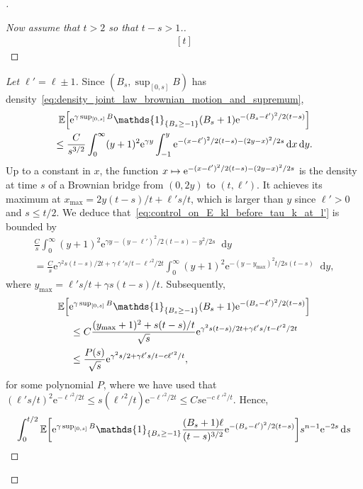 \documentclass[10pt]{amsart}
\theoremstyle{definition}\newtheorem{defi}[theo]{Definition}\newtheorem{rema}[theo]{Remark}\newtheorem{exam}[theo]{Example}\newtheorem{exem}[theo]{Example}\newtheorem{nota}[theo]{Notation}
\newcommand{\e}{\mathrm{e}}
\renewcommand{\d}[1]{\mathop{}\!\mathrm{d}#1}
\newcommand{\E}{\mathbb{E}}
\newcommand\1{\mathds{1}}
\let\originalleft\left
\let\originalright\right
\renewcommand{\left}{\mathopen{}\mathclose\bgroup\originalleft}
\renewcommand{\right}{\aftergroup\egroup\originalright}
\let\oldmapsto\mapsto
\renewcommand*{\mapsto}{\mathchoice{\longmapsto}{\oldmapsto}{\oldmapsto}{\oldmapsto}}
\newenvironment{proofc}[1][\proofname]{\begin{proof}[#1]}{\end{proof}}
\begin{document}
\begin{proofc}
\begin{proof}[{Now assume that $t > 2$ so that $t - s > 1$.}]
\begin{equation}
\begin{aligned}[t]
\end{aligned}
\end{equation}
\let\qed\relax
\end{proof}
\begin{proof}[{Let $\ell' = \ell \pm 1$}]
Since $(B_s, \sup_{[0, s]} B)$ has density~\eqref{eq:density_joint_law_brownian_motion_and_supremum},
\begin{multline}\label{eq:control_on_E_kl_before_tau_k_at_l'}
\E \left[\e^{\gamma \sup_{[0, s]} B} \1_{\{B_s \geq -1\}} (B_s + 1) \e^{-(B_s - \ell')^2/2(t-s)} \right] \\
\leq \frac{C}{s^{3/2}} \int_0^\infty (y + 1)^2 \e^{\gamma y} \int_{-1}^y \e^{-(x - \ell')^2/2(t-s) - (2y - x)^2/2s} \d{x} \d{y}. 
\end{multline}
Up to a constant in $x$, the function $x \mapsto \e^{-(x - \ell')^2/2(t-s) - (2y - x)^2/2s}$ is the density at time $s$ of a Brownian bridge from $(0, 2y)$ to $(t, \ell')$. It achieves its maximum at $x_{\max} = 2y (t-s)/t + \ell' s/t$, which is larger than $y$ since $\ell' > 0$ and $s \leq t/2$. We deduce that~\eqref{eq:control_on_E_kl_before_tau_k_at_l'} is bounded by
\begin{multline}
\frac{C}{s} \int_0^\infty (y + 1)^2 \e^{\gamma y - (y - \ell')^2/2(t-s) - y^2/2s} \d{y} \\
= \frac{C}{s} \e^{\gamma^2 s (t-s)/2t + \gamma \ell' s/t - {\ell'}^2/2t} \int_0^\infty (y + 1)^2 \e^{-(y - y_{\max})^2 t/2s(t-s)} \d{y},
\end{multline}
where $y_{\max} = \ell' s/t + \gamma s(t-s)/t$. Subsequently,
\begin{multline}
\E \left[\e^{\gamma \sup_{[0, s]} B} \1_{\{B_s \geq -1\}} (B_s + 1) \e^{-(B_s - \ell')^2/2(t-s)} \right]\\
\begin{aligned}
& \leq C \frac{(y_{\max} + 1)^2 + s(t-s)/t}{\sqrt{s}} \e^{\gamma^2 s (t-s)/2t + \gamma \ell' s/t - {\ell'}^2/2t}  \\
&\leq \frac{P(s)}{\sqrt{s}} \e^{\gamma^2 s/2 + \gamma \ell' s/t - c{\ell'}^2/t},
\end{aligned}
\end{multline}
for some polynomial $P$, where we have used that $(\ell' s/t)^2 \e^{-{\ell'}^2/2t} \leq s ({\ell'}^2/t) \e^{-{\ell'}^2/2t} \leq C s \e^{-c {\ell'}^2/t}$. Hence,
\begin{multline}\label{eq:bound_for_integral_of_I}
\int_0^{t/2} \E \left[\e^{\gamma \sup_{[0, s]} B} \1_{\{B_s \geq -1\}} \frac{(B_s + 1) \ell}{(t - s)^{3/2}} \e^{-(B_s - \ell')^2/2(t-s)} \right] s^{n - 1} \e^{-2s} \d{s} \\

\end{multline}
\end{proof}
\end{proofc}
\end{document}
